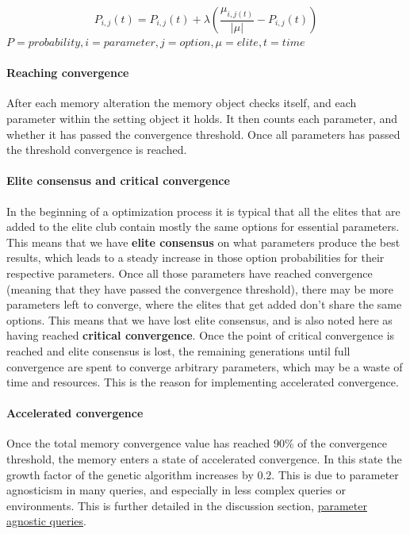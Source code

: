 \documentclass[a4paper,english]{report}
\begin{document}
		\begin{equation}\label{math:probability_vector}
		P_{i,j}(t) = P_{i,j}(t)+\lambda\left(\frac{\mu_{i,j(t)}}{|\mu|}-P_{i,j}(t)\right)
		\end{equation}
		{\centering
		\begin{math}
		P = probability, i = parameter, j = option, \mu = elite, t = time
		\end{math}\\
		}
		\paragraph{Reaching convergence}
		After each memory alteration the memory object checks itself, and each parameter within the setting object it holds. It then counts each parameter, and whether it has passed the convergence threshold. Once all parameters has passed the threshold convergence is reached.
		
		\paragraph{Elite consensus and critical convergence}
		In the beginning of a optimization process it is typical that all the elites that are added to the elite club contain mostly the same options for essential parameters. This means that we have \textbf{elite consensus} on what parameters produce the best results, which leads to a steady increase in those option probabilities for their respective parameters. Once all those parameters have reached convergence (meaning that they have passed the convergence threshold), there may be more parameters left to converge, where the elites that get added don't share the same options. This means that we have lost elite consensus, and is also noted here as having reached \textbf{critical convergence}. Once the point of critical convergence is reached and elite consensus is lost, the remaining generations until full convergence are spent to converge arbitrary parameters, which may be a waste of time and resources. This is the reason for implementing accelerated convergence.
				
		\paragraph{Accelerated convergence}
		Once the total memory convergence value has reached 90\% of the convergence threshold, the memory enters a state of accelerated convergence. In this state the growth factor of the genetic algorithm increases by 0.2. This is due to parameter agnosticism in many queries, and especially in less complex queries or environments. This is further detailed in the discussion section, \hyperref[sec:param_agno]{parameter agnostic queries}.
		
\end{document}
